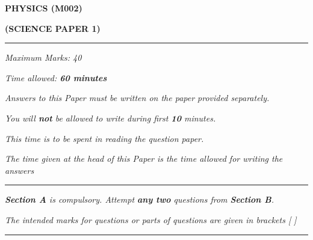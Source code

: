 \begin{center}
   \Large
   \textbf{PHYSICS (M002)}

   \textbf{(SCIENCE PAPER 1)}
   \rule{\textwidth}{0.4pt}
   \normalsize
   \textit{Maximum Marks: 40}

   \textit{Time allowed: \textbf{60 minutes}}

   \textit{Answers to this Paper must be written on the paper provided separately.}

   \textit{You will \textbf{not} be allowed to write during first \textbf{10} minutes.}

   \textit{This time is to be spent in reading the question paper.}

   \textit{The time given at the head of this Paper is the time allowed for writing the answers}
   \rule{\textwidth}{0.4pt}
   \small

   \textit{\textbf{Section A} is compulsory. Attempt \textbf{any two} questions from \textbf{Section B}.}

   \textit{The intended marks for questions or parts of questions are given in brackets [ ]}
   \rule{\textwidth}{0.4pt}
\end{center}
